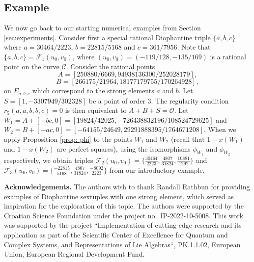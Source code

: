 \documentclass[a4paper]{amsart}
\theoremstyle{plain}
\theoremstyle{definition}
\begin{document}
\subsection*{Example}

We now go back to our starting numerical examples from Section \ref{sec:experiments}. Consider first a special rational Diophantine triple $\{a,b,c\}$ where $a=30464/2223$, $b=22815/5168$ and  $c=361/7956$. Note that $\{a,b,c\}=\mathcal{F}_1(u_0,v_0)$, where $(u_0,v_0)=(-119/128, -135/169)$ is a rational point on the curve $\mathcal{C}$. Consider the rational points
\[
A = [ 250880/6669, 94938136300/252028179 ],
\]
\[
 B = [ 266175/21964, 18177179755/170264928 ],
\]
on $E_{a,b,c}$ which correspond to the strong elements $a$ and $b$.
Let $S=[1,-3307949/302328]$ be a point of order $3$. The regularity condition $r_5(a,a,b,b,c)=0$ is then equivalent to $A+B+S=\mathcal{O}$. Let $W_1=A+[-bc,0]=[19824/42025,-726438832196/108524729625]$ and $W_2=B+[-ac,0]=[-64155/24649,29291888395/1764671208]$. When we apply Proposition \ref{prop: phi} to the points $W_1$ and $W_2$ (recall that $1-x(W_1)$ and $1-x(W_2)$ are perfect squares), using the isomorphisms $\phi_{W_1}$ and $\phi_{W_2}$ respectively, we obtain triples $\mathcal{F}_2(u_0,v_0)=\{ \frac{30464}{2223}, \frac{4807}{31824}, \frac{10881}{1292}\}$ and $\mathcal{F}_3(u_0,v_0)=\{ \frac{-22815}{5168}, \frac{4807}{31824}, \frac{-8092}{2223} \}$ from our introductory example.


{\bf Acknowledgements.}
The authors wish to thank Randall Rathbun for providing examples of Diophantine sextuples with one strong element, which served as inspiration for the exploration of this topic.
The authors were supported by the Croatian Science Foundation under the project no.~IP-2022-10-5008.
This work was supported by the project “Implementation of cutting-edge research and its application as part of the Scientific Center of Excellence for Quantum and Complex Systems, and Representations of Lie Algebras“, PK.1.1.02, European Union, European Regional Development Fund.
\end{document}
